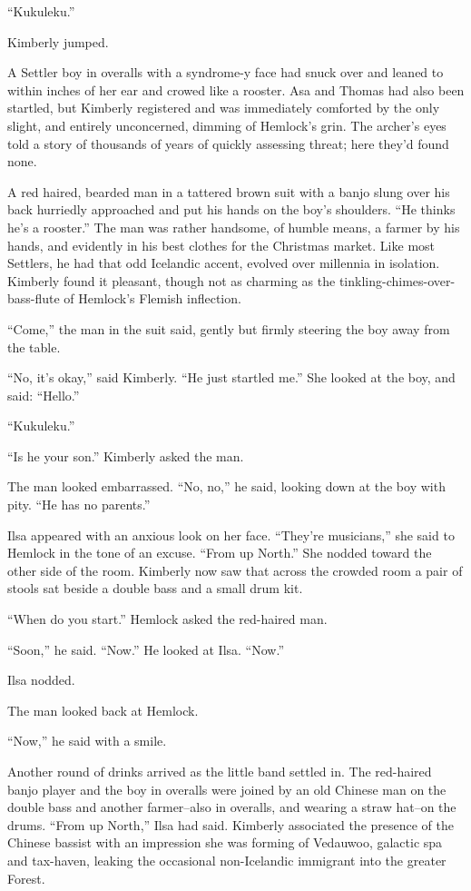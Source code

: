 \documentclass[11pt,a5paper]{article}
\begin{document}
``Kukuleku.''

Kimberly jumped.

A Settler boy in overalls with a syndrome-y face had snuck over and leaned to within inches of her ear and crowed like a rooster. Asa and Thomas had also been startled, but Kimberly registered and was immediately comforted by the only slight, and entirely unconcerned, dimming of Hemlock's grin. The archer's eyes told a story of thousands of years of quickly assessing threat; here they'd found none.

A red haired, bearded man in a tattered brown suit with a banjo slung over his back hurriedly approached and put his hands on the boy's shoulders. ``He thinks he's a rooster.'' The man was rather handsome, of humble means, a farmer by his hands, and evidently in his best clothes for the Christmas market. Like most Settlers, he had that odd Icelandic accent, evolved over millennia in isolation. Kimberly found it pleasant, though not as charming as the tinkling-chimes-over-bass-flute of Hemlock's Flemish inflection.

``Come,'' the man in the suit said, gently but firmly steering the boy away from the table.

``No, it's okay,'' said Kimberly. ``He just startled me.'' She looked at the boy, and said: ``Hello.''

``Kukuleku.''

``Is he your son.'' Kimberly asked the man.

The man looked embarrassed. ``No, no,'' he said, looking down at the boy with pity. ``He has no parents.''

Ilsa appeared with an anxious look on her face. ``They're musicians,'' she said to Hemlock in the tone of an excuse. ``From up North.'' She nodded toward the other side of the room. Kimberly now saw that across the crowded room a pair of stools sat beside a double bass and a small drum kit.

``When do you start.'' Hemlock asked the red-haired man.

``Soon,'' he said. ``Now.'' He looked at Ilsa. ``Now.''

Ilsa nodded.

The man looked back at Hemlock.

``Now,'' he said with a smile.

Another round of drinks arrived as the little band settled in. The red-haired banjo player and the boy in overalls were joined by an old Chinese man on the double bass and another farmer--also in overalls, and wearing a straw hat--on the drums. ``From up North,'' Ilsa had said. Kimberly associated the presence of the Chinese bassist with an impression she was forming of Vedauwoo, galactic spa and tax-haven, leaking the occasional non-Icelandic immigrant into the greater Forest.
\end{document}
